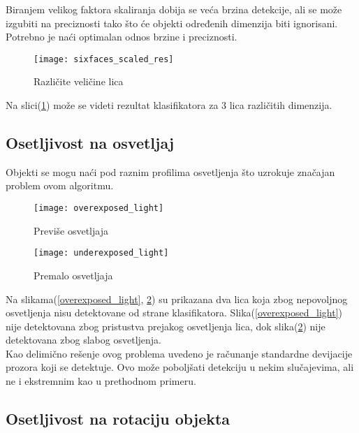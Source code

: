 Biranjem velikog faktora skaliranja dobija se veća brzina detekcije, ali se može
izgubiti na preciznosti tako što će objekti određenih dimenzija biti ignorisani. \\
Potrebno je naći optimalan odnos brzine i preciznosti. \\

\begin{figure}[H]
  \centering
  \texttt{[image: sixfaces\_scaled\_res]}
  \caption{Različite veličine lica}
  \label{sixfaces_scaled}
\end{figure}

Na slici(\ref{sixfaces_scaled}) može se videti rezultat klasifikatora za 3 lica
različitih dimenzija. \\

\newpage

\subsection{Osetljivost na osvetljaj}\label{lumi_inv_sec}

Objekti se mogu naći pod raznim profilima osvetljenja što uzrokuje značajan problem ovom algoritmu.


\begin{figure}[H]
  \centering
  \parbox{0.4\linewidth}{
    \texttt{[image: overexposed\_light]}
    \caption{Previše osvetljaja\cite{CALTECH_DATASET}}
    \label{overexposed_light}}
  \qquad
  \begin{minipage}{0.4\linewidth}
    \texttt{[image: underexposed\_light]}
    \caption{Premalo osvetljaja\cite{CALTECH_DATASET}}
    \label{underexposed_light}
  \end{minipage}
\end{figure}

Na slikama(\ref{overexposed_light}, \ref{underexposed_light}) su prikazana dva
lica koja zbog nepovoljnog osvetljenja nisu detektovane od strane
klasifikatora.
Slika(\ref{overexposed_light}) nije detektovana zbog pristustva prejakog osvetljenja
lica, dok slika(\ref{underexposed_light}) nije detektovana zbog slabog
osvetljenja.  \\

Kao delimično rešenje ovog problema uvedeno je računanje standardne devijacije
prozora koji se detektuje.
Ovo može poboljšati detekciju u nekim slučajevima, ali ne i ekstremnim kao u
prethodnom primeru.

\subsection{Osetljivost na rotaciju objekta}

